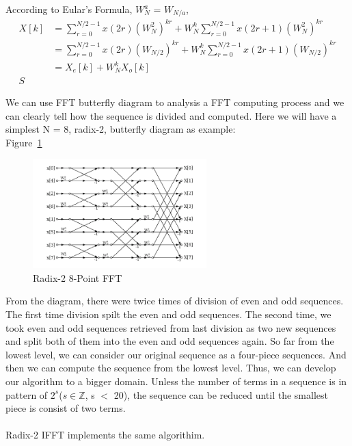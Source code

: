 \documentclass[12pt]{article}
\begin{document}
According to Eular's Formula, $W_{N}^{a}$ = $W_{N/a}$,\\

\begin{align*}
X[k] & =  \sum\limits_{r=0}^{N/2 -1}x(2r)(W_{N}^{2})^{kr} + W_{N}^{k}\sum\limits_{r=0}^{N/2 -1}x(2r+1)(W_{N}^{2})^{kr}\\
& = \sum\limits_{r=0}^{N/2 -1}x(2r)(W_{N/2})^{kr} + W_{N}^{k}\sum\limits_{r=0}^{N/2 -1}x(2r+1)(W_{N/2})^{kr}\\
& = X_e[k] + W_N^kX_o[k]\\S
\end{align*}

We can use FFT butterfly diagram to analysis a  FFT computing process and we can clearly tell how the sequence is divided and computed. Here we will have a simplest
N = 8, radix-2, butterfly diagram as example:\\

Figure~\ref{Fig_Radix-2FFT}

\begin{figure}[h!]
\begin{center}
 \includegraphics[width=0.6\textwidth]{butterflyRedix2}
\caption{Radix-2 8-Point FFT}
\label{Fig_Radix-2FFT}
\end{center}
\end{figure}

From the diagram, there were twice times of division of even and odd sequences. The first time division spilt the even and odd sequences. The second time, we took even and odd sequences retrieved from last division as two new sequences and split both of them into the even and odd sequences again. So far from the lowest level, we can consider our original sequence as a four-piece sequences. And then we can compute the sequence from the lowest level. Thus, we can develop our algorithm to a bigger domain. Unless the number of terms
in a sequence is in pattern of  $2^s$($s\in\mathbb{Z}$, s $<$ 20), the sequence can be reduced until the smallest piece is consist of two terms.\\
\\
Radix-2 IFFT implements the same algorithim.\\
\end{document}

